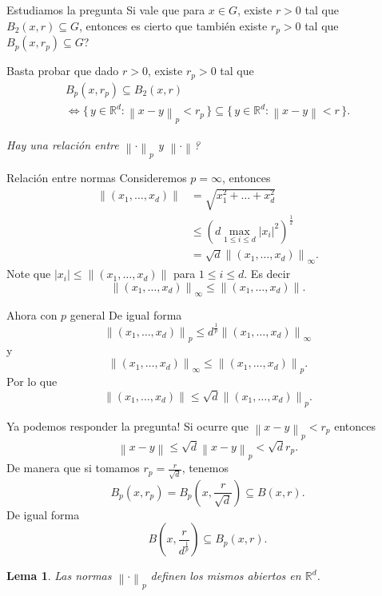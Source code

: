\documentclass[utf8]{beamer}
\theoremstyle{plain}
\newtheorem{Lem}{Lema}                 %
\theoremstyle{definition}
\theoremstyle{remark}
\numberwithin{equation}{section}
\newcommand{\bR}{\mathbb{R}}    %
\newcommand{\nm}[1]{\left\|#1\right\|} %
\newcommand{\set}[1]{\{\,#1\,\}}    %
\renewcommand{\leq}{\leqslant}          %
\begin{document}
\begin{frame}{Estudiamos la pregunta}
    Si vale que para $x\in G$, existe $r>0$ tal que $B_2(x,r)\subseteq G$, entonces es cierto que tambi\'en existe $r_p>0$ tal que $B_p(x,r_p)\subseteq G$?\par 
    Basta probar que dado $r>0$, existe $r_p>0$ tal que 
    \begin{gather*}
        B_p(x,r_p)\subseteq B_2(x,r)\\
        \iff \set{y\in\bR^d: \nm{x-y}_p<r_p}\subseteq \set{y\in\bR^d: \nm{x-y}<r}.
    \end{gather*}
    \begin{center}
        \emph{Hay una relaci\'on entre $\nm{\cdot}_p$ y $\nm\cdot$?}
    \end{center}
    
\end{frame}

\begin{frame}{Relaci\'on entre normas}
    Consideremos $p=\infty$, entonces
    \begin{align*}
        \nm{(x_1,\dots,x_d)}&=\sqrt{x_1^2+\dots+x_d^2}\\
        &\leq (d\max_{1\leq i\leq d}|x_i|^2)^{\frac12}\\
        &=\sqrt{d}\nm{(x_1,\dots,x_d)}_\infty.
    \end{align*}
    Note que $|x_i|\leq \nm{(x_1,\dots,x_d)}$ para $1\leq i\leq d$. Es decir
    $$\nm{(x_1,\dots,x_d)}_\infty\leq \nm{(x_1,\dots,x_d)}.$$
\end{frame}

\begin{frame}{Ahora con $p$ general}
    De igual forma 
    $$\nm{(x_1,\dots,x_d)}_p\leq d^{\frac1p}\nm{(x_1,\dots,x_d)}_\infty$$
    y 
    $$\nm{(x_1,\dots,x_d)}_\infty\leq \nm{(x_1,\dots,x_d)}_p.$$
    Por lo que
    $$\nm{(x_1,\dots,x_d)}\leq \sqrt{d}\nm{(x_1,\dots,x_d)}_p.$$
\end{frame}

\begin{frame}{Ya podemos responder la pregunta!}
    Si ocurre que $\nm{x-y}_p<r_p$ entonces
    $$\nm{x-y}\leq \sqrt{d}\nm{x-y}_p<\sqrt{d}r_p.$$
    De manera que si tomamos $r_p=\frac{r}{\sqrt{d}}$, tenemos
    $$B_p(x,r_p)=B_p\left(x,\frac{r}{\sqrt{d}}\right)\subseteq B(x,r).$$
    De igual forma 
    $$B\left(x,\frac{r}{d^{\frac{1}{p}}}\right)\subseteq B_p(x,r).$$
    \begin{Lem}
        Las normas $\nm{\cdot}_p$ definen los mismos abiertos en $\bR^d$.
    \end{Lem}
\end{frame}
\end{document}
